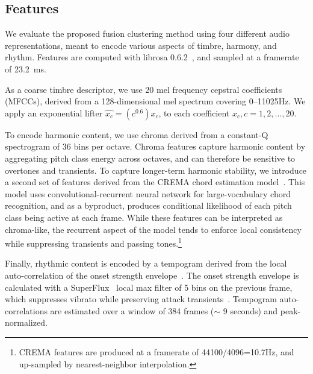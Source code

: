 \documentclass{article}
\begin{document}
\subsection{Features}\label{sec:features}

We evaluate the proposed fusion clustering method using four different audio representations, meant to encode various aspects of timbre, harmony, and rhythm.
Features are computed with librosa 0.6.2~\cite{brian_mcfee_2018_1342708}, and sampled at a framerate of 23.2~ms.

As a coarse timbre descriptor, we use 20 mel frequency cepstral coefficients (MFCCs), derived from a 128-dimensional mel spectrum covering 0--11025Hz.  We apply an exponential lifter $\hat{x_c} = (c^{0.6}) x_c$, to each coefficient $x_c, c=1, 2, \hdots, 20$.

To encode harmonic content, we use chroma derived from a constant-Q spectrogram of 36 bins per octave.
Chroma features capture harmonic content by aggregating pitch class energy across octaves, and can therefore be sensitive to overtones and transients.
To capture longer-term harmonic stability, we introduce a second set of features derived from the CREMA chord estimation model~\cite{mcfee2017structured}.
This model uses  convolutional-recurrent neural network for large-vocabulary chord recognition, and as a byproduct, produces conditional likelihood of each pitch class being active at each frame.
While these features can be interpreted as chroma-like, the recurrent aspect of the model tends to enforce local consistency while suppressing transients and passing tones.\footnote{CREMA features are produced at a framerate of 44100/4096=10.7Hz, and up-sampled by nearest-neighbor interpolation.}


Finally, rhythmic content is encoded by a tempogram derived from the local auto-correlation of the onset strength envelope~\cite{grosche2011tempogram}.
The onset strength envelope is calculated with a SuperFlux~\cite{bock2013maximum} local max filter of 5 bins on the previous frame, which suppresses vibrato while preserving attack transients~\cite{bock2013maximum}.
Tempogram auto-correlations are estimated over a window of 384 frames ($\sim$ 9 seconds) and peak-normalized.

\end{document}
